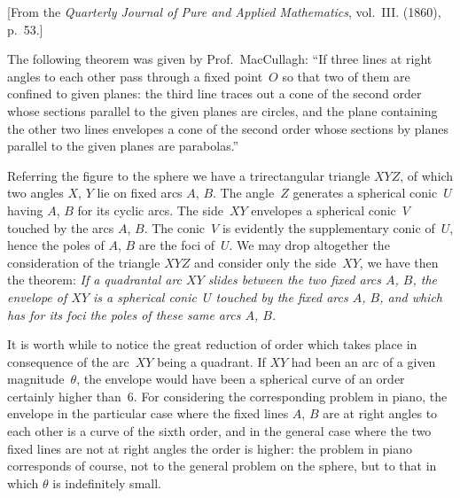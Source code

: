 \documentclass[12pt,a4paper]{article}
\theoremstyle{definition}
\begin{document}
[From the \textit{Quarterly Journal of Pure and Applied Mathematics}, vol.~III. (1860),
p.~53.]

The following theorem was given by Prof.~MacCullagh: ``If three lines at right
angles to each other pass through a fixed point~$O$ so that two of them are confined
to given planes: the third line traces out a cone of the second order whose sections
parallel to the given planes are circles, and the plane containing the other two lines
envelopes a cone of the second order whose sections by planes parallel to the given
planes are parabolas.''

Referring the figure to the sphere we have a trirectangular triangle $XYZ$, of which
two angles $X$, $Y$ lie on fixed arcs $A$, $B$. The angle~$Z$ generates a spherical conic~$U$
having $A$, $B$ for its cyclic arcs. The side~$XY$ envelopes a spherical conic~$V$ touched
by the arcs $A$, $B$. The conic~$V$ is evidently the supplementary conic of~$U$, hence
the poles of $A$, $B$ are the foci of~$U$. We may drop altogether the consideration of
the triangle $XYZ$ and consider only the side~$XY$, we have then the theorem:
\textit{If a quadrantal arc $XY$ slides between the two fixed arcs $A$, $B$, the envelope of
$XY$ is a spherical conic~$U$ touched by the fixed arcs $A$, $B$, and which has for its
foci the poles of these same arcs $A$, $B$.}

It is worth while to notice the great reduction of order which takes place in
consequence of the arc~$XY$ being a quadrant. If $XY$ had been an arc of a given
magnitude~$\theta$, the envelope would have been a spherical curve of an order certainly
higher than~6. For considering the corresponding problem in piano, the envelope in
the particular case where the fixed lines $A$, $B$ are at right angles to each other
is a curve of the sixth order, and in the general case where the two fixed lines are
not at right angles the order is higher: the problem in piano corresponds of course,
not to the general problem on the sphere, but to that in which $\theta$ is indefinitely small.
\end{document}
